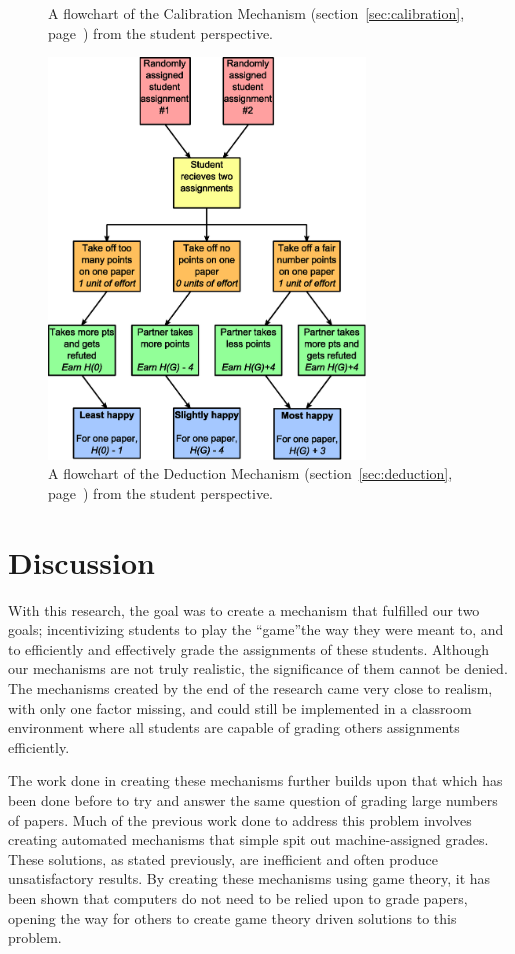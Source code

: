 \documentclass[12pt, Arial]{article}
\begin{document}
{\begin{figure}
		\caption {A flowchart of the Calibration Mechanism (section~\ref{sec:calibration}, page~\pageref{sec:calibration}) from the student perspective.\label{fig:calibration}}
\end{figure}
\begin{figure}
	\centering
		\includegraphics[width=0.75\textwidth]{Flowchart-Deduction.eps}
		\caption {A flowchart of the Deduction Mechanism (section~\ref{sec:deduction}, page~\pageref{sec:deduction}) from the student perspective.\label{fig:deduction}}
\end{figure}
}
\section{Discussion}
With this research, the goal was to create a mechanism that fulfilled our two goals; incentivizing students to play the ``game''the way they were meant to, and to efficiently and effectively grade the assignments of these students. Although our mechanisms are not truly realistic, the significance of them cannot be denied. The mechanisms created by the end of the research came very close to realism, with only one factor missing, and could still be implemented in a classroom environment where all students are capable of grading others assignments efficiently.

The work done in creating these mechanisms further builds upon that which has been done before to try and answer the same question of grading large numbers of papers. Much of the previous work done to address this problem involves creating automated mechanisms that simple spit out machine-assigned grades. These solutions, as stated previously, are inefficient and often produce unsatisfactory results. By creating these mechanisms using game theory, it has been shown that computers do not need to be relied upon to grade papers, opening the way for others to create game theory driven solutions to this problem.
\end{document}
